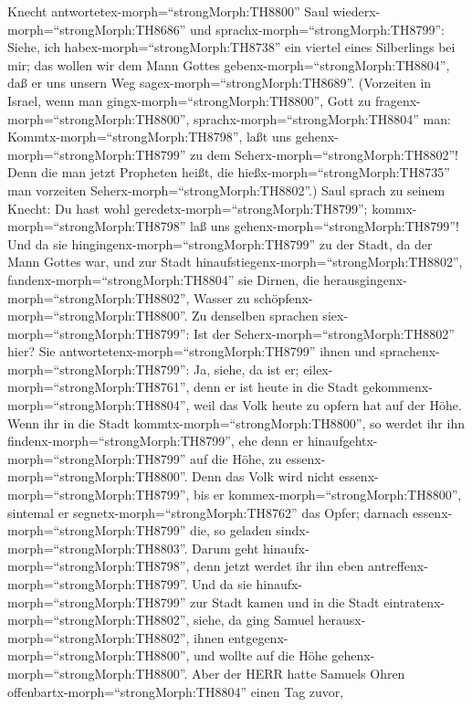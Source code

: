 Knecht antwortetex-morph=``strongMorph:TH8800'' Saul
wiederx-morph=``strongMorph:TH8686'' und
sprachx-morph=``strongMorph:TH8799'': Siehe, ich
habex-morph=``strongMorph:TH8738'' ein viertel eines Silberlings bei
mir; das wollen wir dem Mann Gottes gebenx-morph=``strongMorph:TH8804'',
daß er uns unsern Weg sagex-morph=``strongMorph:TH8689''. 
(Vorzeiten in Israel, wenn man gingx-morph=``strongMorph:TH8800'', Gott
zu fragenx-morph=``strongMorph:TH8800'',
sprachx-morph=``strongMorph:TH8804'' man:
Kommtx-morph=``strongMorph:TH8798'', laßt uns
gehenx-morph=``strongMorph:TH8799'' zu dem
Seherx-morph=``strongMorph:TH8802''! Denn die man jetzt Propheten heißt,
die hießx-morph=``strongMorph:TH8735'' man vorzeiten
Seherx-morph=``strongMorph:TH8802''.)  Saul sprach zu
seinem Knecht: Du hast wohl geredetx-morph=``strongMorph:TH8799'';
kommx-morph=``strongMorph:TH8798'' laß uns
gehenx-morph=``strongMorph:TH8799''! Und da sie
hingingenx-morph=``strongMorph:TH8799'' zu der Stadt, da der Mann Gottes
war,  und zur Stadt
hinaufstiegenx-morph=``strongMorph:TH8802'',
fandenx-morph=``strongMorph:TH8804'' sie Dirnen, die
herausgingenx-morph=``strongMorph:TH8802'', Wasser zu
schöpfenx-morph=``strongMorph:TH8800''. Zu denselben sprachen
siex-morph=``strongMorph:TH8799'': Ist der
Seherx-morph=``strongMorph:TH8802'' hier?  Sie
antwortetenx-morph=``strongMorph:TH8799'' ihnen und
sprachenx-morph=``strongMorph:TH8799'': Ja, siehe, da ist er;
eilex-morph=``strongMorph:TH8761'', denn er ist heute in die Stadt
gekommenx-morph=``strongMorph:TH8804'', weil das Volk heute zu opfern
hat auf der Höhe.  Wenn ihr in die Stadt
kommtx-morph=``strongMorph:TH8800'', so werdet ihr ihn
findenx-morph=``strongMorph:TH8799'', ehe denn er
hinaufgehtx-morph=``strongMorph:TH8799'' auf die Höhe, zu
essenx-morph=``strongMorph:TH8800''. Denn das Volk wird nicht
essenx-morph=``strongMorph:TH8799'', bis er
kommex-morph=``strongMorph:TH8800'', sintemal er
segnetx-morph=``strongMorph:TH8762'' das Opfer; darnach
essenx-morph=``strongMorph:TH8799'' die, so geladen
sindx-morph=``strongMorph:TH8803''. Darum geht
hinaufx-morph=``strongMorph:TH8798'', denn jetzt werdet ihr ihn eben
antreffenx-morph=``strongMorph:TH8799''.  Und da sie
hinaufx-morph=``strongMorph:TH8799'' zur Stadt kamen und in die Stadt
eintratenx-morph=``strongMorph:TH8802'', siehe, da ging Samuel
herausx-morph=``strongMorph:TH8802'', ihnen
entgegenx-morph=``strongMorph:TH8800'', und wollte auf die Höhe
gehenx-morph=``strongMorph:TH8800''.  Aber der HERR hatte
Samuels Ohren offenbartx-morph=``strongMorph:TH8804'' einen Tag zuvor,
